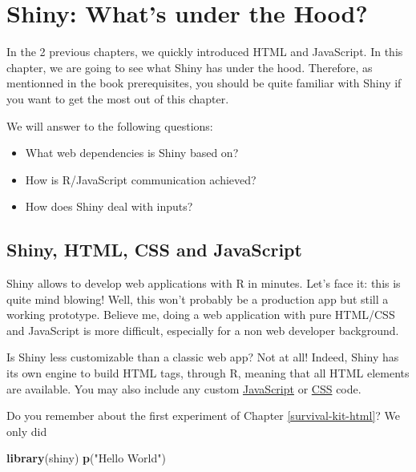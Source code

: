 \documentclass[]{book}
\newenvironment{Shaded}{\begin{snugshade}}{\end{snugshade}}
\newcommand{\KeywordTok}[1]{\textcolor[rgb]{0.13,0.29,0.53}{\textbf{#1}}}
\newcommand{\NormalTok}[1]{#1}
\newcommand{\StringTok}[1]{\textcolor[rgb]{0.31,0.60,0.02}{#1}}
\providecommand{\tightlist}{%
  \setlength{\itemsep}{0pt}\setlength{\parskip}{0pt}}
\begin{document}
\hypertarget{survival-kit-shiny}{%
\chapter{Shiny: What's under the Hood?}\label{survival-kit-shiny}}

In the 2 previous chapters, we quickly introduced HTML and JavaScript. In this chapter, we are going to see what Shiny has under the hood. Therefore, as mentionned in the book prerequisites, you should be quite familiar with Shiny if you want to get the most out of this chapter.

We will answer to the following questions:

\begin{itemize}
\tightlist
\item
  What web dependencies is Shiny based on?
\item
  How is R/JavaScript communication achieved?
\item
  How does Shiny deal with inputs?
\end{itemize}

\hypertarget{shiny-html-css-and-javascript}{%
\section{Shiny, HTML, CSS and JavaScript}\label{shiny-html-css-and-javascript}}

Shiny allows to develop web applications with R in minutes. Let's face it: this is quite mind blowing! Well, this won't probably be a production app but still a working prototype. Believe me, doing a web application with pure HTML/CSS and JavaScript is more difficult, especially for a non web developer background.

Is Shiny less customizable than a classic web app? Not at all! Indeed, Shiny has its own engine to build HTML tags, through R, meaning that all HTML elements are available. You may also include any custom \href{https://shiny.rstudio.com/articles/packaging-javascript.html}{JavaScript} or \href{https://mastering-shiny.org/advanced-ui.html}{CSS} code.

Do you remember about the first experiment of Chapter \ref{survival-kit-html}? We only did

\begin{Shaded}
\begin{Highlighting}[]
\KeywordTok{library}\NormalTok{(shiny)}
\KeywordTok{p}\NormalTok{(}\StringTok{"Hello World"}\NormalTok{)}
\end{Highlighting}
\end{Shaded}
\end{document}
